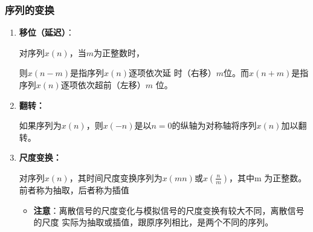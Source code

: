 \documentclass[notheorems,compress,mathserif,table]{beamer}
\begin{document}
\begin{frame}[shrink]\frametitle{序列的变换}
  \begin{enumerate}
    \item \textbf{移位（延迟）}：\par 对序列$x(n)$，当$m$为正整数时，\par 则$x(n-m)$是指序列$x(n)$逐项依次延
        时（右移）$m$位。而$x(n+m)$是指序列$x(n)$逐项依次超前（左移）$m$ 位。
    \item \textbf{翻转：}  \par 如果序列为$x(n)$，则$x(-n)$是以$n=0$的纵轴为对称轴将序列$x(n)$加以翻转。
    \item \textbf{尺度变换：} \par 对序列$x(n)$，其时间尺度变换序列为$x(mn)$或$x(\frac{n}{m})$，其中m 为正整数。
        前者称为抽取，后者称为插值
        \begin{itemize}
          \item \textbf{注意}：离散信号的尺度变化与模拟信号的尺度变换有较大不同，离散信号的尺度
        实际为抽取或插值，跟原序列相比，是两个不同的序列。
        \end{itemize}

\end{enumerate}
\end{frame}

%
%
%
%
%
%
%
%
\end{document}

